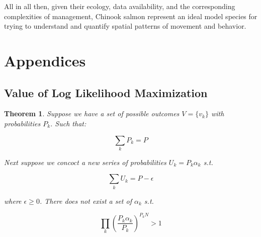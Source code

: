 \documentclass[11pt]{article}
\newtheorem{theorem}{Theorem}
\begin{document}
All in all then, given their ecology, data availability, and the corresponding complexities of management, Chinook salmon represent an ideal model species for trying to understand and quantify spatial patterns of movement and behavior. 





















\newpage

















































\section{Appendices}


\subsection{Value of Log Likelihood Maximization}

\begin{theorem}
Suppose we have a set of possible outcomes $V=\lbrace v_k \rbrace$ with probabilities $P_k$. Such that:

$$\sum_k P_k = P$$

Next suppose we concoct a new series of probabilities $U_k = P_k \alpha_k$ s.t. 

$$\sum_k U_k = P-\epsilon$$

where $\epsilon \geq 0$. There does not exist a set of $\alpha_k$ s.t.

$$\prod_k \left(\frac{P_k\alpha_k}{P_k}\right)^{P_kN}>1$$

\end{theorem}
\end{document}
